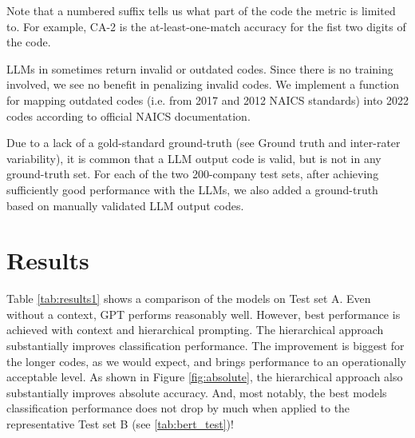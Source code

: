 \documentclass[fleqn,moreauthors,10pt]{ds_report}
\begin{document}
Note that a numbered suffix tells us what part of the code the metric is limited to. For example, CA-2 is the at-least-one-match accuracy for the fist two digits of the code.

LLMs in sometimes return invalid or outdated codes. Since there is no training involved, we see no benefit in penalizing invalid codes. We implement a function for mapping outdated codes (i.e. from 2017 and 2012 NAICS standards) into 2022 codes according to official NAICS documentation.

Due to a lack of a gold-standard ground-truth (see Ground truth and inter-rater variability), it is common that a LLM output code is valid, but is not in any ground-truth set. For each of the two 200-company test sets, after achieving sufficiently good performance with the LLMs, we also added a ground-truth based on manually validated LLM output codes.

\section*{Results}

Table \ref{tab:results1} shows a comparison of the models on Test set A. Even without a context, GPT performs reasonably well. However, best performance is achieved with context and hierarchical prompting. The hierarchical approach substantially improves classification performance. The improvement is biggest for the longer codes, as we would expect, and brings performance to an operationally acceptable level. As shown in Figure \ref{fig:absolute}, the hierarchical approach also substantially improves absolute accuracy. And, most notably, the best models classification performance does not drop by much when applied to the representative Test set B (see \ref{tab:bert_test})!
\end{document}
